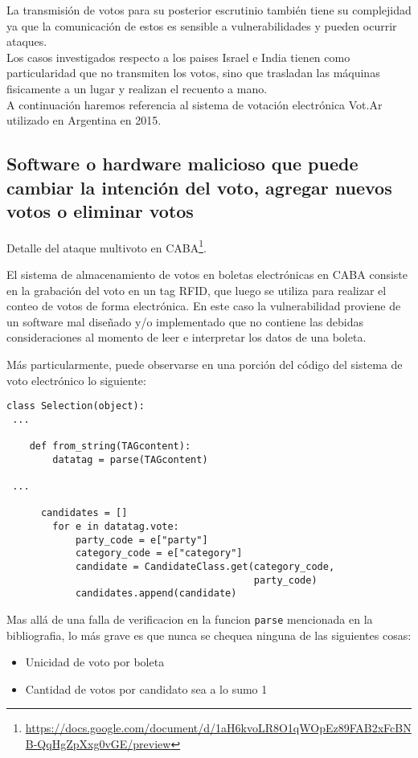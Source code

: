 La transmisión de votos para su posterior escrutinio también tiene su complejidad ya que la comunicación de estos es sensible a vulnerabilidades y pueden ocurrir ataques.\\
Los casos investigados respecto a los paises Israel e India tienen como particularidad que no transmiten los votos, sino que trasladan las máquinas fisicamente a un lugar y realizan el recuento a mano. \\
A continuación haremos referencia al sistema de votación electrónica Vot.Ar utilizado en Argentina en 2015.

\subsection{Software o hardware malicioso que puede cambiar la intención del voto, agregar nuevos votos o eliminar votos}
Detalle del ataque multivoto en CABA\footnote{\url{https://docs.google.com/document/d/1aH6kvoLR8O1qWOpEz89FAB2xFcBNB-QqHgZpXxg0vGE/preview}}.

El sistema de almacenamiento de votos en boletas electrónicas en CABA consiste en la grabación del voto en un tag RFID, que luego se utiliza para realizar el conteo de votos de forma electrónica. En este caso la vulnerabilidad proviene de un software mal diseñado y/o implementado que no contiene las debidas consideraciones al momento de leer e interpretar los datos de una boleta.

Más particularmente, puede observarse en una porción del código del sistema de voto electrónico lo siguiente:

\begin{lstlisting}
class Selection(object):
 ...

    def from_string(TAGcontent):
        datatag = parse(TAGcontent)

 ...

      candidates = []
        for e in datatag.vote:
            party_code = e["party"]
            category_code = e["category"]
            candidate = CandidateClass.get(category_code,
                                           party_code)
            candidates.append(candidate)

\end{lstlisting}

Mas allá de una falla de verificacion en la funcion \texttt{parse} mencionada en la bibliografia, lo más grave es que nunca se chequea ninguna de las siguientes cosas:
\begin{itemize}
	\item Unicidad de voto por boleta
	\item Cantidad de votos por candidato sea a lo sumo 1
\end{itemize}

